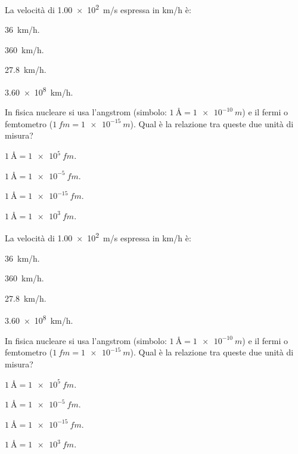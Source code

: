 \documentclass{article}
\begin{document}
\begin{enumext*}[columns=2,save-ans=sabastiano,labelsep=1cm, show-ans=true]
 \item La velocità di \SI{1,00e2}{m/s} espressa in \si{km/h} è:
   \begin{keyans*}
     \item \SI{36}{km/h}.
     \item* \SI{360}{km/h}.
     \item \SI{27,8}{km/h}.
     \item \SI{3,60e8}{km/h}.
   \end{keyans*}

 \item In fisica nucleare si usa l'angstrom (simbolo:
 $\SI{1}{\angstrom} = \SI{1e-10}{m}$) e il fermi o femtometro
 ($\SI{1}{fm} = \SI{1e-15}{m}$). Qual è la relazione tra queste due
 unità di misura?
   \begin{keyans}
     \item* $\SI{1}{\angstrom}=\SI{1e5}{fm}$.
     \item $\SI{1}{\angstrom}=\SI{1e-5}{fm}$.
     \item $\SI{1}{\angstrom}=\SI{1e-15}{fm}$.
     \item $\SI{1}{\angstrom}=\SI{1e3}{fm}$.
   \end{keyans}

 \item La velocità di \SI{1,00e2}{m/s} espressa in \si{km/h} è:
   \begin{keyans}
     \item \SI{36}{km/h}.
     \item* \SI{360}{km/h}.
     \item \SI{27,8}{km/h}.
     \item \SI{3,60e8}{km/h}.
   \end{keyans}

 \item In fisica nucleare si usa l'angstrom (simbolo:
 $\SI{1}{\angstrom} = \SI{1e-10}{m}$) e il fermi o femtometro
 ($\SI{1}{fm} = \SI{1e-15}{m}$). Qual è la relazione tra queste due
 unità di misura?
   \begin{keyans}
     \item* $\SI{1}{\angstrom}=\SI{1e5}{fm}$.
     \item $\SI{1}{\angstrom}=\SI{1e-5}{fm}$.
     \item $\SI{1}{\angstrom}=\SI{1e-15}{fm}$.
     \item $\SI{1}{\angstrom}=\SI{1e3}{fm}$.
   \end{keyans}
\end{enumext*}

\end{document}
